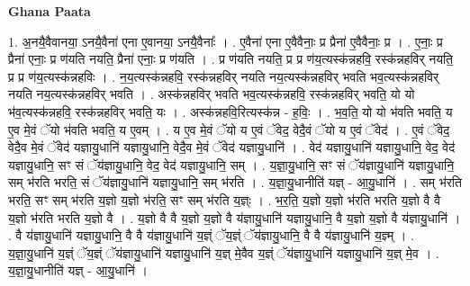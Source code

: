 \documentclass[17pt]{extarticle}
\begin{document}
\textbf{Ghana Paata } \newline

1. अ॒नयै॒वैवानया॒ ऽनयै॒वैना॑ एना ए॒वानया॒ ऽनयै॒वैनाः᳚ । . ए॒वैना॑ एना ए॒वैवैनाः॒ प्र प्रैना॑ ए॒वैवैनाः॒ प्र । . ए॒नाः॒ प्र प्रैना॑ एनाः॒ प्र ण॑यति नयति॒ प्रैना॑ एनाः॒ प्र ण॑यति । . प्र ण॑यति नयति॒ प्र प्र ण॑य॒त्यस्क॑न्नहवि॒ रस्क॑न्नहविर् नयति॒ प्र प्र ण॑य॒त्यस्क॑न्नहविः । . न॒य॒त्यस्क॑न्नहवि॒ रस्क॑न्नहविर् नयति नय॒त्यस्क॑न्नहविर् भवति भव॒त्यस्क॑न्नहविर् नयति नय॒त्यस्क॑न्नहविर् भवति । . अस्क॑न्नहविर् भवति भव॒त्यस्क॑न्नहवि॒ रस्क॑न्नहविर् भवति॒ यो यो भ॑व॒त्यस्क॑न्नहवि॒ रस्क॑न्नहविर् भवति॒ यः । . अस्क॑न्नहवि॒रित्यस्क॑न्न - ह॒विः॒ । . भ॒व॒ति॒ यो यो भ॑वति भवति॒ य ए॒व मे॒वं ॅयो भ॑वति भवति॒ य ए॒वम् । . य ए॒व मे॒वं ॅयो य ए॒वं ॅवेद॒ वेदै॒वं ॅयो य ए॒वं ॅवेद॑ । . ए॒वं ॅवेद॒ वेदै॒व मे॒वं ॅवेद॑ यज्ञायु॒धानि॑ यज्ञायु॒धानि॒ वेदै॒व मे॒वं ॅवेद॑ यज्ञायु॒धानि॑ । . वेद॑ यज्ञायु॒धानि॑ यज्ञायु॒धानि॒ वेद॒ वेद॑ यज्ञायु॒धानि॒ सꣳ सं ॅय॑ज्ञायु॒धानि॒ वेद॒ वेद॑ यज्ञायु॒धानि॒ सम् । . य॒ज्ञा॒यु॒धानि॒ सꣳ सं ॅय॑ज्ञायु॒धानि॑ यज्ञायु॒धानि॒ सम् भ॑रति भरति॒ सं ॅय॑ज्ञायु॒धानि॑ यज्ञायु॒धानि॒ सम् भ॑रति । . य॒ज्ञा॒यु॒धानीति॑ यज्ञ् - आ॒यु॒धानि॑ । . सम् भ॑रति भरति॒ सꣳ सम् भ॑रति य॒ज्ञो य॒ज्ञो भ॑रति॒ सꣳ सम् भ॑रति य॒ज्ञ्ः । . भ॒र॒ति॒ य॒ज्ञो य॒ज्ञो भ॑रति भरति य॒ज्ञो वै वै य॒ज्ञो भ॑रति भरति य॒ज्ञो वै । . य॒ज्ञो वै वै य॒ज्ञो य॒ज्ञो वै य॑ज्ञायु॒धानि॑ यज्ञायु॒धानि॒ वै य॒ज्ञो य॒ज्ञो वै य॑ज्ञायु॒धानि॑ । . वै य॑ज्ञायु॒धानि॑ यज्ञायु॒धानि॒ वै वै य॑ज्ञायु॒धानि॑ य॒ज्ञ्ं ॅय॒ज्ञ्ं ॅय॑ज्ञायु॒धानि॒ वै वै य॑ज्ञायु॒धानि॑ य॒ज्ञ्म् । . य॒ज्ञा॒यु॒धानि॑ य॒ज्ञ्ं ॅय॒ज्ञ्ं ॅय॑ज्ञायु॒धानि॑ यज्ञायु॒धानि॑ य॒ज्ञ् मे॒वैव य॒ज्ञ्ं ॅय॑ज्ञायु॒धानि॑ यज्ञायु॒धानि॑ य॒ज्ञ् मे॒व । . य॒ज्ञा॒यु॒धानीति॑ यज्ञ् - आ॒यु॒धानि॑ । \newline
\end{document}

